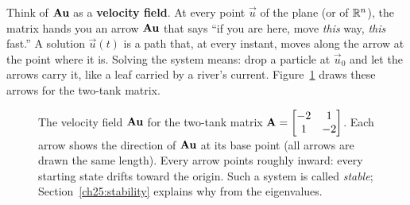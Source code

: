 \begin{intuitionbox}
Think of $\mathbf{A}\mathbf{u}$ as a \textbf{velocity field}. At every point $\vec{u}$
of the plane (or of $\mathbb{R}^n$), the matrix hands you an arrow $\mathbf{A}\mathbf{u}$ that
says ``if you are here, move \emph{this} way, \emph{this} fast.'' A solution
$\vec{u}(t)$ is a path that, at every instant, moves along the arrow at the
point where it is. Solving the system means: drop a particle at $\vec{u}_0$ and
let the arrows carry it, like a leaf carried by a river's current.
Figure~\ref{ch25:fig-field} draws these arrows for the two-tank matrix.
\end{intuitionbox}

\begin{figure}[H]
\centering
{}
\caption{The velocity field $\mathbf{A}\mathbf{u}$ for the two-tank matrix
$\mathbf{A}=\protect\begin{bmatrix}-2&1\\1&-2\protect\end{bmatrix}$. Each arrow
shows the direction of $\mathbf{A}\mathbf{u}$ at its base point (all arrows are drawn
the same length). Every arrow points roughly inward: every starting state
drifts toward the origin. Such a system is called \emph{stable};
Section~\ref{ch25:stability} explains why from the eigenvalues.}
\label{ch25:fig-field}
\end{figure}

